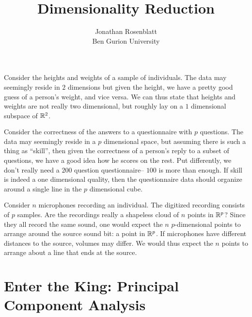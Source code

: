 \documentclass[12pt,a4paper]{article}
\author{Jonathan Rosenblatt \\ Ben Gurion University}
\title{Dimensionality Reduction}
\begin{document}
\maketitle

\tableofcontents

\hrulefill

\begin{example}[BMI]
	\label{ex:bmi}
	Consider the heights and weights of a sample of individuals. 
	The data may seemingly reside in $2$ dimensions but given the height, we have a pretty good guess of a person's weight, and vice versa. 
	We can thus state that heights and weights are not really two dimensional, but roughly lay on a $1$ dimensional subspace of $\mathbb{R}^2$. 
\end{example}


\begin{example}[g-factor]
	\label{ex:iq}
	Consider the correctness of the answers to a questionnaire with $p$ questions. 
	The data may seemingly reside in a $p$ dimensional space, but assuming there is such a thing as ``skill'', then given the correctness of a person's reply to a subset of questions, we have a good idea how he scores on the rest. 
	Put differently, we don't really need a $200$ question questionnaire-- $100$ is more than enough.
	If skill is indeed a one dimensional quality, then the questionnaire data should organize around a single line in the $p$ dimensional cube. 
\end{example}



\begin{example}
	\label{ex:blind-signal}
	Consider $n$ microphones recording an individual. 
	The digitized recording consists of $p$ samples. 
	Are the recordings really a shapeless cloud of $n$ points in $\mathbb{R}^p$?
	Since they all record the same sound, one would expect the $n$ $p$-dimensional points to arrange around the source sound bit: a point in $\mathbb{R}^p$.
	If microphones have different distances to the source, volumes may differ. 
	We would thus expect the $n$ points to arrange about a line that ends at the source. 	
\end{example}
		
	






\section{Enter the King: Principal Component Analysis}
\label{sec:pca}
\end{document}
